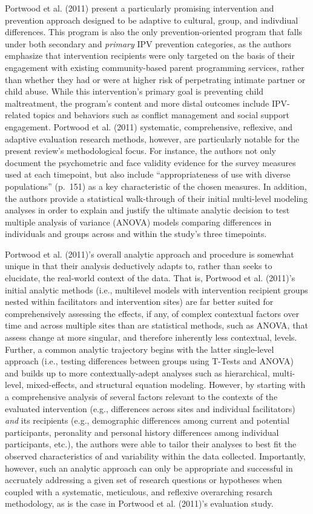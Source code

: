 \documentclass[11pt,]{tufte-book}
\begin{document}
Portwood et al. (2011) present a particularly promising intervention and
prevention approach designed to be adaptive to cultural, group, and
indivdiual differences. This program is also the only
prevention-oriented program that falls under both secondary and
\emph{primary} IPV prevention categories, as the authors emphasize that
intervention recipients were only targeted on the basis of their
engagement with existing community-based parent programming services,
rather than whether they had or were at higher risk of perpetrating
intimate partner or child abuse. While this intervention's primary goal
is preventing child maltreatment, the program's content and more distal
outcomes include IPV-related topics and behaviors such as conflict
management and social support engagement. Portwood et al. (2011)
systematic, comprehensive, reflexive, and adaptive evaluation research
methods, however, are particularly notable for the present review's
methodological focus. For instance, the authors not only document the
psychometric and face validity evidence for the survey measures used at
each timepoint, but also include ``appropriateness of use with diverse
populations'' (p.~151) as a key characteristic of the chosen measures.
In addition, the authors provide a statistical walk-through of their
initial multi-level modeling analyses in order to explain and justify
the ultimate analytic decision to test multiple analysis of variance
(ANOVA) models comparing differences in individuals and groups across
and within the study's three timepoints.

Portwood et al. (2011)'s overall analytic approach and procedure is
somewhat unique in that their analysis deductively adapts to, rather
than seeks to elucidate, the real-world context of the data. That is,
Portwood et al. (2011)'s initial analytic methods (i.e., multilevel
models with intervention recipient groups nested within facilitators and
intervention sites) are far better suited for comprehensively assessing
the effects, if any, of complex contextual factors over time and across
multiple sites than are statistical methods, such as ANOVA, that assess
change at more singular, and therefore inherently less contextual,
levels. Further, a common analytic trajectory begins with the latter
single-level approach (i.e., testing differences between groups using
T-Tests and ANOVA) and builds up to more contextually-adept analyses
such as hierarchical, multi-level, mixed-effects, and structural
equation modeling. However, by starting with a comprehensive analysis of
several factors relevant to the contexts of the evaluated intervention
(e.g., differences across sites and individual facilitators) \emph{and}
its recipients (e.g., demographic differences among current and
potential participants, peronality and personal history differences
among individual participants, etc.), the authors were able to tailor
their analyses to best fit the observed characteristics of and
variability within the data collected. Importantly, however, such an
analytic approach can only be appropriate and successful in accruately
addressing a given set of research questions or hypotheses when coupled
with a systematic, meticulous, and reflexive overarching resarch
methodology, as is the case in Portwood et al. (2011)'s evaluation
study.
\end{document}
